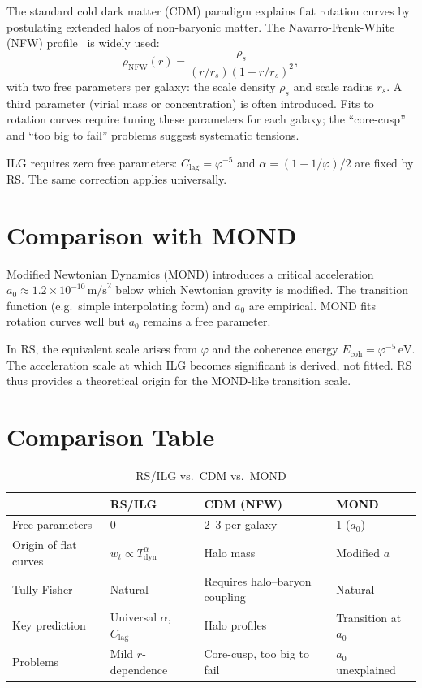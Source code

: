 \documentclass[12pt,a4paper]{article}
\theoremstyle{definition}
\theoremstyle{remark}
\begin{document}
The standard cold dark matter (CDM) paradigm explains flat rotation
curves by postulating extended halos of non-baryonic matter.  The
Navarro-Frenk-White (NFW) profile~\cite{NFW1997} is widely used:
\begin{equation}
  \rho_{\mathrm{NFW}}(r) = \frac{\rho_s}{(r/r_s)(1 + r/r_s)^2},
\end{equation}
with two free parameters per galaxy: the scale density $\rho_s$ and
scale radius $r_s$.  A third parameter (virial mass or concentration)
is often introduced.  Fits to rotation curves require tuning these
parameters for each galaxy; the ``core-cusp'' and ``too big to fail''
problems suggest systematic tensions.

ILG requires zero free parameters: $C_{\mathrm{lag}} = \varphi^{-5}$
and $\alpha = (1 - 1/\varphi)/2$ are fixed by RS.  The same
correction applies universally.

\section{Comparison with MOND}
\label{sec:mond}

Modified Newtonian Dynamics (MOND) introduces a critical acceleration
$a_0 \approx 1.2 \times 10^{-10}\,\mathrm{m/s}^2$ below which
Newtonian gravity is modified.  The transition function (e.g.\
simple interpolating form) and $a_0$ are empirical.  MOND fits
rotation curves well but $a_0$ remains a free parameter.

In RS, the equivalent scale arises from $\varphi$ and the coherence
energy $E_{\mathrm{coh}} = \varphi^{-5}\,\mathrm{eV}$.  The
acceleration scale at which ILG becomes significant is derived, not
fitted.  RS thus provides a theoretical origin for the MOND-like
transition scale.

\section{Comparison Table}
\label{sec:table}

\begin{table}[h]
\centering
\caption{RS/ILG vs.\ CDM vs.\ MOND}
\begin{tabular}{@{}llll@{}}
\toprule
 & RS/ILG & CDM (NFW) & MOND \\
\midrule
Free parameters & 0 & 2--3 per galaxy & 1 ($a_0$) \\
Origin of flat curves & $w_t \propto T_{\mathrm{dyn}}^\alpha$ & Halo mass & Modified $a$ \\
Tully-Fisher & Natural & Requires halo--baryon coupling & Natural \\
Key prediction & Universal $\alpha$, $C_{\mathrm{lag}}$ & Halo profiles & Transition at $a_0$ \\
Problems & Mild $r$-dependence & Core-cusp, too big to fail & $a_0$ unexplained \\
\bottomrule
\end{tabular}
\end{table}
\end{document}
